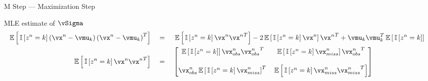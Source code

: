 \documentclass{article}
\begin{document}
\begin{question}
\begin{qsection}{M Step --- Maximization Step}
\begin{qsubsection}{MLE estimate of $\vSigma$}
			\begin{align*}
				\E{\is{z^n = k} \para{\vx^n - \vmu_k} \para{\vx^n - \vmu_k}^T}	&\eq	\E{\is{z^n = k} \vx^n {\vx^n}^T} - 2 \E{\is{z^n = k} \vx^n} {\vx^n}^T + \vmu_k \vmu_k^T \E{\is{z^n = k}} \\
				\E{\is{z^n = k} \vx^n {\vx^n}^T}								&\eq	\begin{bmatrix}
																							\E{\is{z^n = k}} \vx_{obs}^n {\vx_{obs}^n}^T	&	\E{\is{z^n = k} \vx_{miss}^n} {\vx_{obs}^n}^T \\\\
																							\vx_{obs}^n \E{\is{z^n = k} \vx_{miss}^n}^T		&	\E{\is{z^n = k} \vx_{miss}^n {\vx_{miss}^n}^T}
																						\end{bmatrix}
			\end{align*}
			
		\end{qsubsection}
		
	\end{qsection}

\end{question}
\end{document}
